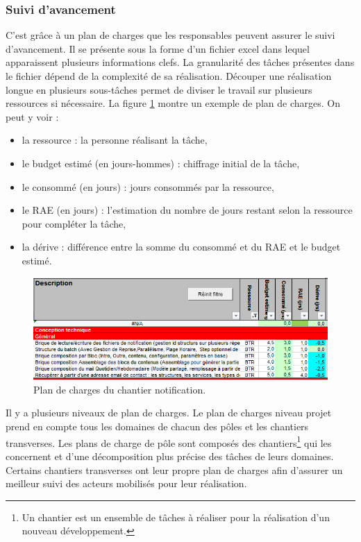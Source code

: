 \documentclass[12pt,a4paper]{article}
\begin{document}
\subsubsection{Suivi d’avancement}
C'est grâce à un plan de charges que les responsables peuvent assurer le suivi d'avancement. Il se présente sous la forme d'un fichier excel dans lequel apparaissent plusieurs informations clefs. La granularité des tâches présentes dans le fichier dépend de la complexité de sa réalisation. Découper une réalisation longue en plusieurs sous-tâches permet de diviser le travail sur plusieurs ressources si nécessaire. La figure \ref{pdc} montre un exemple de plan de charges.
\newpage
On peut  y voir :
\begin{itemize}
\item la ressource : la personne réalisant la tâche,
\item le budget estimé (en jours-hommes) : chiffrage initial de la tâche,
\item le consommé (en jours) : jours consommés par la ressource,
\item le \gls{RAE} (en jours) : l'estimation du nombre de jours restant selon la ressource pour compléter la tâche,
\item la dérive : différence entre la somme du consommé et du \gls{RAE} et le budget estimé.
\end{itemize}
\begin{figure}[H]
	\begin{center}
		\includegraphics[width=\textwidth,height=\textheight,keepaspectratio]{planDeCharge.png}
		\caption{Plan de charges du chantier notification.}
		\label{pdc}
	\end{center}
\end{figure}
Il y a plusieurs niveaux de plan de charges. Le plan de charges niveau projet prend en compte tous les domaines de chacun des pôles et les chantiers transverses. Les plans de charge de pôle sont composés des chantiers\footnote{Un chantier est un ensemble de tâches à réaliser pour la réalisation d'un nouveau développement.} qui les concernent et d'une décomposition plus précise des tâches de leurs domaines. Certains chantiers transverses ont leur propre plan de charges afin d'assurer un meilleur suivi des acteurs mobilisés pour leur réalisation.
\end{document}
